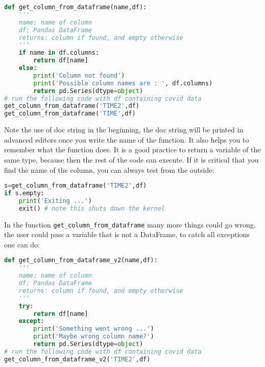 \documentclass[graybox,sectrefs,envcountresetchap,open=right,final]{svmonodo}
\begin{document}
\begin{lstlisting}[language=python,style=blue1bar]
def get_column_from_dataframe(name,df):
    '''
    name: name of column
    df: Pandas DataFrame
    returns: column if found, and empty otherwise 
    '''
    if name in df.columns:
        return df[name]
    else:
        print('Column not found')
        print('Possible column names are : ', df.columns)
        return pd.Series(dtype=object)
# run the following code with df containing covid data
get_column_from_dataframe('TIME2',df)
get_column_from_dataframe('TIME',df)

\end{lstlisting}

Note the use of doc string in the beginning, the doc string will be printed in advanced editors once you write the name of the function. It also helps you to remember what the function does. It is a good practice to return a variable of the same type, because then the rest of the code can execute. If it is critical that you find the name of the column, you can always test from the outside:





\begin{lstlisting}[language=python,style=blue1bar]
s=get_column_from_dataframe('TIME2',df)
if s.empty:
    print('Exiting ...')
    exit() # note this shuts down the kernel

\end{lstlisting}

In the function \Verb!get_column_from_dataframe! many more things could go wrong, the user could pass a variable that is not a DataFrame, to catch all exceptions one can do:















\begin{lstlisting}[language=python,style=blue1bar]
def get_column_from_dataframe_v2(name,df):
    '''
    name: name of column
    df: Pandas DataFrame
    returns: column if found, and empty otherwise 
    '''
    try:
        return df[name]
    except:
        print('Something went wrong ...')
        print('Maybe wrong column name?')
        return pd.Series(dtype=object)
# run the following code with df containing covid data
get_column_from_dataframe_v2('TIME2',df)

\end{lstlisting}
\end{document}
